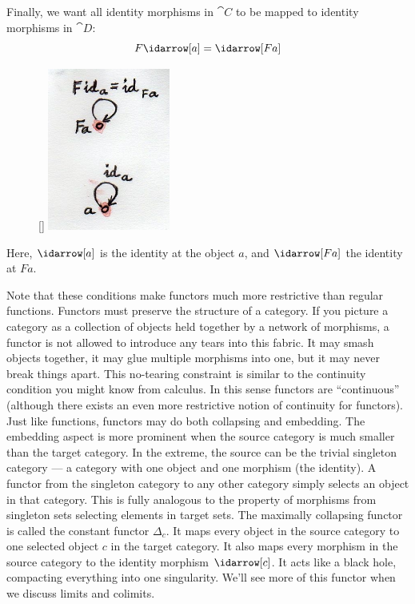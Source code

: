 \noindent
Finally, we want all identity morphisms in $\cat{C}$ to be mapped to identity morphisms in
$\cat{D}$:
\[F \idarrow[a] = \idarrow[F a]\]

\begin{figure}
\raisebox{0pt}[\dimexpr{}\baselineskip\relax]{
\includegraphics[width=40mm]{images/functorid.jpg}}
\end{figure}
Here, $\idarrow[a]$ is the identity at the object $a$,
and $\idarrow[F a]$ the identity at $F a$.

\noindent
Note that these
conditions make functors much more restrictive than regular functions.
Functors must preserve the structure of a category. If you picture a
category as a collection of objects held together by a network of
morphisms, a functor is not allowed to introduce any tears into this
fabric. It may smash objects together, it may glue multiple morphisms
into one, but it may never break things apart. This no-tearing
constraint is similar to the continuity condition you might know from
calculus. In this sense functors are ``continuous'' (although there
exists an even more restrictive notion of continuity for functors). Just
like functions, functors may do both collapsing and embedding. The
embedding aspect is more prominent when the source category is much
smaller than the target category. In the extreme, the source can be the
trivial singleton category --- a category with one object and one
morphism (the identity). A functor from the singleton category to any
other category simply selects an object in that category. This is fully
analogous to the property of morphisms from singleton sets selecting
elements in target sets. The maximally collapsing functor is called the
constant functor $\Delta_c$. It maps every object in the source
category to one selected object $c$ in the target category. It also
maps every morphism in the source category to the identity morphism
$\idarrow[c]$. It acts like a black hole, compacting
everything into one singularity. We'll see more of this functor when we
discuss limits and colimits.

